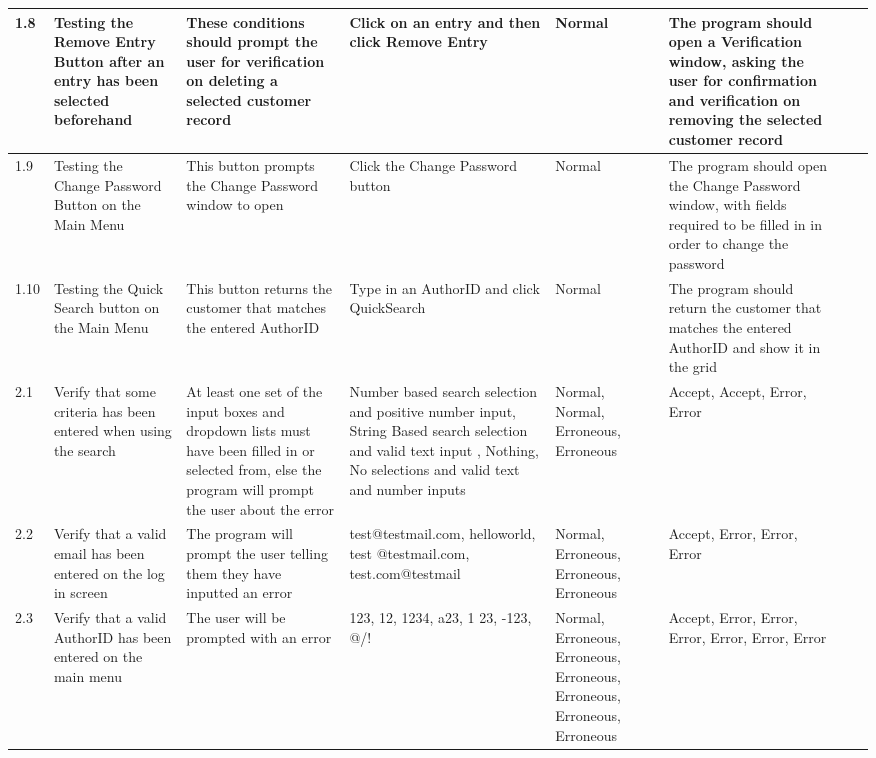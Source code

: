 \begin{landscape}
\begin{center}
\begin{longtable}{|p{1.5cm}|p{2.5cm}|p{2.5cm}|p{2cm}|p{2cm}|p{2cm}|p{2cm}|p{2cm}|}
        1.8 & Testing the Remove Entry Button after an entry has been selected beforehand & These conditions should prompt the user for verification on deleting a selected customer record & Click on an entry and then click Remove Entry & Normal & The program should open a Verification window, asking the user for confirmation and verification on removing the selected customer record & & \\ \hline
        1.9 & Testing the Change Password Button on the Main Menu & This button prompts the Change Password window to open & Click the Change Password button & Normal & The program should open the Change Password window, with fields required to be filled in in order to change the password & & \\ \hline
        1.10 & Testing the Quick Search button on the Main Menu & This button returns the customer that matches the entered AuthorID & Type in an AuthorID and click QuickSearch & Normal & The program should return the customer that matches the entered AuthorID and show it in the grid & & \\ \hline
        2.1 & Verify that some criteria has been entered when using the search & At least one set of the input boxes and dropdown lists must have been filled in or selected from, else the program will prompt the user about the error & Number based search selection and positive number input, String Based search selection and valid text input , Nothing, No selections and valid text and number inputs & Normal, Normal, Erroneous, Erroneous & Accept, Accept, Error, Error & & \\ \hline
        2.2 & Verify that a valid email has been entered on the log in screen &  The program will prompt the user telling them they have inputted an error & test@testmail.com, helloworld, test @testmail.com, test.com@testmail & Normal, Erroneous, Erroneous, Erroneous & Accept, Error, Error, Error & & \\ \hline
        2.3 & Verify that a valid AuthorID has been entered on the main menu & The user will be prompted with an error & 123, 12, 1234, a23, 1 23, -123, @/! & Normal, Erroneous, Erroneous, Erroneous, Erroneous, Erroneous, Erroneous & Accept, Error, Error, Error, Error, Error, Error & & \\ \hline

    \end{longtable}
\end{center}
\end{landscape}